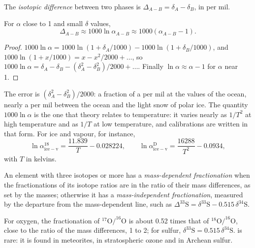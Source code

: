 \begin{definition}\label{def:b3:stable-isotopes:big-delta}
The \emph{isotopic difference}
between two phases is $\Delta_{A-B} = \delta_A - \delta_B$, in per mil.
\end{definition}

\begin{proposition}
\label{prop:b3:stable-isotopes:big-delta}
For $\alpha$ close to 1 and small $\delta$ values,
\[
\Delta_{A-B} \approx 1000\ln\alpha_{A-B} \approx 1000(\alpha_{A-B} - 1).
\]
\end{proposition}

\begin{proof}
$1000\ln\alpha = 1000\ln(1 + \delta_A/1000) - 1000\ln(1 + \delta_B/1000)$, and
$1000\ln(1 + x/1000) = x - x^2/2000 + \dots$, so $1000\ln\alpha = \delta_A -
\delta_B - (\delta_A^2 - \delta_B^2)/2000 + \dots$. Finally $\ln\alpha \approx
\alpha - 1$ for $\alpha$ near 1.
\end{proof}

The error is $(\delta_A^2 - \delta_B^2)/2000$: a fraction of a per mil at the
values of the ocean, nearly a per mil between the ocean and the light snow of
polar ice.
The quantity $1000\ln\alpha$ is the one that theory relates to temperature: it
varies nearly as $1/T^2$ at high temperature and as $1/T$ at low temperature,
and calibrations are written in that form. For ice and vapour, for instance,
\[
\ln\alpha^{18}_{\mathrm{ice-v}} = \frac{11.839}{T} - 0.028224, \qquad
\ln\alpha^{\mathrm D}_{\mathrm{ice-v}} = \frac{16288}{T^2} - 0.0934,
\]
with $T$ in kelvins.

\begin{definition}\label{def:b3:stable-isotopes:mif}
An element with three isotopes or more has a \emph{mass-dependent
fractionation} when the fractionations of
its isotope ratios are in the ratio of their mass differences, as set by the
masses; otherwise it has a \emph{mass-independent
fractionation}, measured by the departure
from the mass-dependent line, such as $\Delta^{33}\mathrm S = \delta^{33}\mathrm S
- 0.515\,\delta^{34}\mathrm S$.
\end{definition}

For oxygen, the fractionation of $^{17}\mathrm O/^{16}\mathrm O$ is about 0.52 times that
of $^{18}\mathrm O/^{16}\mathrm O$, close to the ratio of the mass differences, 1 to 2;
for sulfur, $\delta^{33}\mathrm S = 0.515\,\delta^{34}\mathrm S$.  is rare: it is found in meteorites, in stratospheric ozone and
in Archean sulfur.

